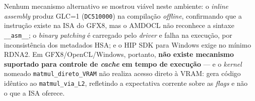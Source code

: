 Nenhum mecanismo alternativo se mostrou viável neste ambiente: o \textit{inline
assembly} produz GLC=1 (\texttt{DC510000}) na compilação \textit{offline},
confirmando que a instrução existe na ISA do GFX8, mas o AMDOCL não reconhece a
sintaxe \texttt{\_\_asm\_\_}; o \textit{binary patching} é carregado pelo
\textit{driver} e falha na execução, por inconsistência dos metadados HSA; e o HIP
SDK para Windows exige no mínimo RDNA2. Em GFX8/OpenCL/Windows, portanto,
\textbf{não existe mecanismo suportado para controle de \textit{cache} em tempo de
execução} --- e o \textit{kernel} nomeado \texttt{matmul\_direto\_VRAM} não realiza
acesso direto à VRAM: gera código idêntico ao \texttt{matmul\_via\_L2}, refletindo a
expectativa corrente sobre as \textit{flags} e não o que a ISA oferece.
